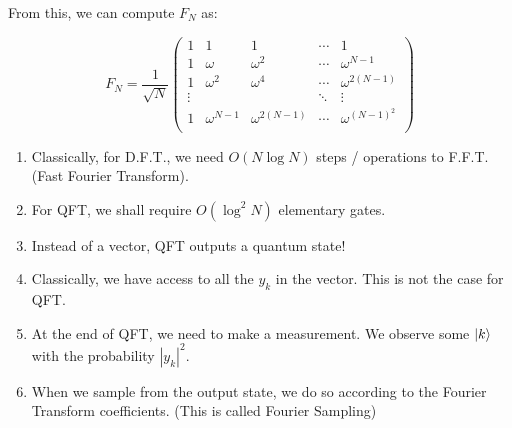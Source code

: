 \documentclass[11.5pt, paper=a4]{article}
\theoremstyle{definition}
\numberwithin{theorem}{section}
\begin{document}
From this, we can compute $F_N$ as:

\[
    F_N = \displaystyle \frac{1}{\sqrt{N}} \begin{pmatrix}
        1      & 1            & 1               & \cdots & 1                \\
        1      & \omega       & \omega^2        & \cdots & \omega^{N-1}     \\
        1      & \omega^2     & \omega^4        & \cdots & \omega^{2(N-1)}  \\
        \vdots &              &                 & \ddots & \vdots           \\
        1      & \omega^{N-1} & \omega^{2(N-1)} & \cdots & \omega^{(N-1)^2} \\
    \end{pmatrix}
\]

\begin{enumerate}
    \item Classically, for D.F.T., we need $O(N \log{N})$ steps / operations to F.F.T. (Fast Fourier Transform).
    \item For QFT, we shall require $O(\log^2{N})$ elementary gates.
    \item Instead of a vector, QFT outputs a quantum state!
    \item Classically, we have access to all the $y_k$ in the vector. This is not the case for QFT.
    \item At the end of QFT, we need to make a measurement. We observe some $\ket{k}$ with the probability $|y_k|^2$.
    \item When we sample from the output state, we do so according to the Fourier Transform coefficients. (This is called Fourier Sampling)
\end{enumerate}





\nocite{*}

\end{document}
